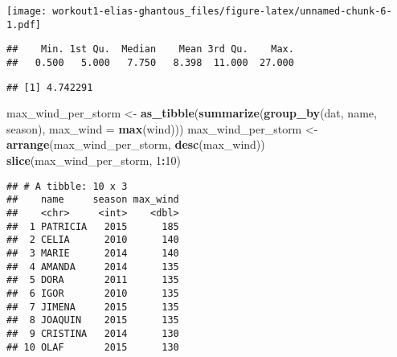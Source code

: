 \documentclass[]{article}
\newenvironment{Shaded}{\begin{snugshade}}{\end{snugshade}}
\newcommand{\KeywordTok}[1]{\textcolor[rgb]{0.13,0.29,0.53}{\textbf{#1}}}
\newcommand{\DataTypeTok}[1]{\textcolor[rgb]{0.13,0.29,0.53}{#1}}
\newcommand{\DecValTok}[1]{\textcolor[rgb]{0.00,0.00,0.81}{#1}}
\newcommand{\StringTok}[1]{\textcolor[rgb]{0.31,0.60,0.02}{#1}}
\newcommand{\OperatorTok}[1]{\textcolor[rgb]{0.81,0.36,0.00}{\textbf{#1}}}
\newcommand{\NormalTok}[1]{#1}
\begin{document}
\texttt{[image: workout1-elias-ghantous\_files/figure-latex/unnamed-chunk-6-1.pdf]}

\begin{Shaded}
\end{Shaded}

\begin{verbatim}
##    Min. 1st Qu.  Median    Mean 3rd Qu.    Max. 
##   0.500   5.000   7.750   8.398  11.000  27.000
\end{verbatim}

\begin{Shaded}
\end{Shaded}

\begin{verbatim}
## [1] 4.742291
\end{verbatim}

\begin{Shaded}
\begin{Highlighting}[]
\NormalTok{max_wind_per_storm <-}\StringTok{ }\KeywordTok{as_tibble}\NormalTok{(}\KeywordTok{summarize}\NormalTok{(}\KeywordTok{group_by}\NormalTok{(dat, name, season), }\DataTypeTok{max_wind =} \KeywordTok{max}\NormalTok{(wind)))}
\NormalTok{max_wind_per_storm <-}\StringTok{ }\KeywordTok{arrange}\NormalTok{(max_wind_per_storm, }\KeywordTok{desc}\NormalTok{(max_wind))}
\KeywordTok{slice}\NormalTok{(max_wind_per_storm, }\DecValTok{1}\OperatorTok{:}\DecValTok{10}\NormalTok{)}
\end{Highlighting}
\end{Shaded}

\begin{verbatim}
## # A tibble: 10 x 3
##    name     season max_wind
##    <chr>     <int>    <dbl>
##  1 PATRICIA   2015      185
##  2 CELIA      2010      140
##  3 MARIE      2014      140
##  4 AMANDA     2014      135
##  5 DORA       2011      135
##  6 IGOR       2010      135
##  7 JIMENA     2015      135
##  8 JOAQUIN    2015      135
##  9 CRISTINA   2014      130
## 10 OLAF       2015      130
\end{verbatim}
\end{document}
